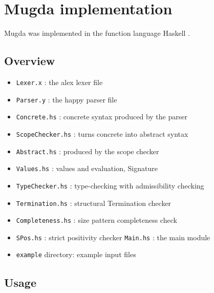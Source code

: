 \appendix
\chapter{Mugda implementation}
Mugda was implemented in the function language Haskell \cite{haskell}.
\section{Overview}
\begin{itemize}
\item
\texttt{Lexer.x} : the alex lexer file
\item
\texttt{Parser.y} : the happy parser file
\item
\texttt{Concrete.hs} : concrete syntax produced by the parser
\item
\texttt{ScopeChecker.hs} : turns concrete into abstract syntax
\item
\texttt{Abstract.hs} : produced by the scope checker
\item
\texttt{Values.hs} : values and evaluation, Signature 
\item
\texttt{TypeChecker.hs} : type-checking with admissibility checking
\item
\texttt{Termination.hs} : structural Termination checker
\item
\texttt{Completeness.hs} : size pattern completeness check
\item
\texttt{SPos.hs} : strict positivity checker
\texttt{Main.hs} : the main module
\item
\texttt{example} directory: example input files
\end{itemize}

\section{Usage}

